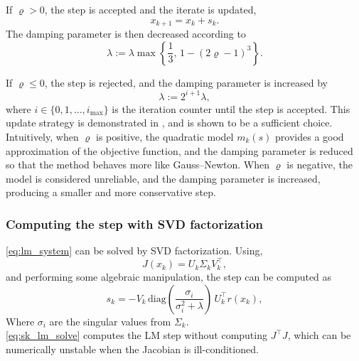 If $\varrho > 0$, the step is accepted and the iterate is updated,
\[
x_{k+1} = x_k + s_k.
\]
The damping parameter is then decreased according to
\begin{equation}
\label{eq:dec_lambda}
\lambda := 
\lambda \max \left\{ \frac{1}{3},\, 1 - (2\varrho - 1)^3 \right\}.
\end{equation}

If $\varrho \le 0$, the step is rejected, and the damping parameter is increased by
\begin{equation}
\label{eq:inc_lambda}
\lambda := 2^{i+1}\lambda,
\end{equation}
where $i\in \{0,1,\dots,i_{\max}\}$ is the iteration counter until the step is accepted. This update strategy is demonstrated in \cite{nielsen1999}, and is shown to be a sufficient choice.\\

Intuitively, when $\varrho$ is positive, the quadratic model $m_k(s)$ provides a good approximation of the objective function, and the damping parameter is reduced so that the method behaves more like Gauss--Newton. When $\varrho$ is negative, the model is considered unreliable, and the damping parameter is increased, producing a smaller and more conservative step.


\subsubsection{Computing the step with SVD factorization}
\cref{eq:lm_system} can be solved by SVD factorization. Using,
\begin{equation*}
    J(x_k) = U_k \Sigma_k V_k^\top,
\end{equation*}
and performing some algebraic manipulation, the step can be computed as
\begin{equation}
\label{eq:sk_lm_solve}
    s_k = -V_k \, \text{diag}\left(\dfrac{\sigma_i}{\sigma_i^2 + \lambda} \right) \, U_k^\top r(x_k), 
\end{equation}
Where $\sigma_i$ are the singular values from $\Sigma_k$.\\

\cref{eq:sk_lm_solve} computes the LM step without computing $J^\top J$, which can be numerically unstable when the Jacobian is ill-conditioned.


